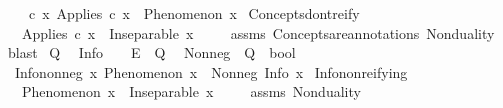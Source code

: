 \begin{isabellebody}
\ \ \ \ {\isachardoublequoteopen}{\isasymforall}c\ x{\isachardot}{\kern0pt}\ Applies\ c\ x\ {\isasymlongrightarrow}\ Phenomenon\ x{\isachardoublequoteclose}\isanewline
\isanewline
{}\isamarkupfalse%
\ Concepts{\isacharunderscore}{\kern0pt}don{\isacharprime}{\kern0pt}t{\isacharunderscore}{\kern0pt}reify{\isacharcolon}{\kern0pt}\isanewline
\ \ \ {\isachardoublequoteopen}Applies\ c\ x{\isachardoublequoteclose}\ \ {\isachardoublequoteopen}Inseparable\ x\ {\isasymOmega}{\isachardoublequoteclose}\isanewline
%
\isadelimproof
\ \ %
\endisadelimproof
%
\isatagproof
{}\isamarkupfalse%
\ assms\ Concepts{\isacharunderscore}{\kern0pt}are{\isacharunderscore}{\kern0pt}annotations\ Nonduality\ \isamarkupfalse%
\ blast%
\endisatagproof
{\isafoldproof}%
%
\isadelimproof
%
\endisadelimproof
%
\isadelimdocument
%
\endisadelimdocument
%
\isatagdocument
%
\isamarkuptrue%
%
\endisatagdocument
{\isafolddocument}%
%
\isadelimdocument
%
\endisadelimdocument
{}\isamarkupfalse%
\ Q%
\isadelimdocument
%
\endisadelimdocument
%
\isatagdocument
%
\isamarkuptrue%
%
\endisatagdocument
{\isafolddocument}%
%
\isadelimdocument
%
\endisadelimdocument
{}\isamarkupfalse%
\isanewline
\ \ Info\ \ \ {\isacharcolon}{\kern0pt}{\isacharcolon}{\kern0pt}\ {\isachardoublequoteopen}E\ {\isasymRightarrow}\ Q{\isachardoublequoteclose}\isanewline
\ \ Nonneg\ {\isacharcolon}{\kern0pt}{\isacharcolon}{\kern0pt}\ {\isachardoublequoteopen}Q\ {\isasymRightarrow}\ bool{\isachardoublequoteclose}\isanewline
\isanewline
{}\isamarkupfalse%
\ \isanewline
\ \ Info{\isacharunderscore}{\kern0pt}nonneg{\isacharcolon}{\kern0pt}\ {\isachardoublequoteopen}{\isasymforall}x{\isachardot}{\kern0pt}\ Phenomenon\ x\ {\isasymlongrightarrow}\ Nonneg\ {\isacharparenleft}{\kern0pt}Info\ x{\isacharparenright}{\kern0pt}{\isachardoublequoteclose}\isanewline
\isanewline
{}\isamarkupfalse%
\ Info{\isacharunderscore}{\kern0pt}nonreifying{\isacharcolon}{\kern0pt}\isanewline
\ \ \ {\isachardoublequoteopen}Phenomenon\ x{\isachardoublequoteclose}\ \ {\isachardoublequoteopen}Inseparable\ x\ {\isasymOmega}{\isachardoublequoteclose}\isanewline
%
\isadelimproof
\ \ %
\endisadelimproof
%
\isatagproof
{}\isamarkupfalse%
\ assms\ Nonduality\ \isamarkupfalse%

\end{isabellebody}

